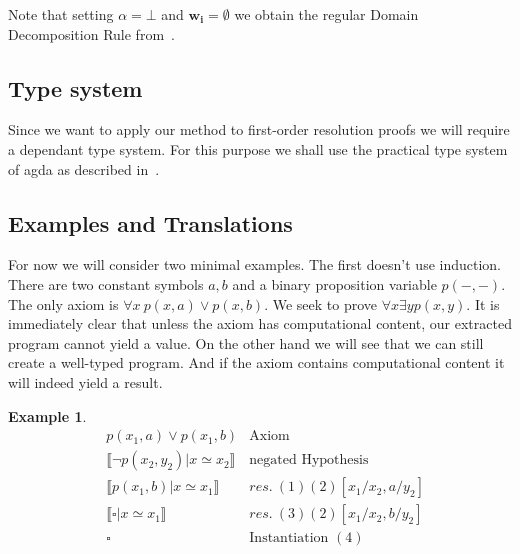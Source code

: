 \documentclass[onehalfspacing]{article}
\newtheorem{example}[theorem]{Example}
\newcommand{\llb}{\llbracket}
\newcommand{\rrb}{\rrbracket}
\begin{document}
Note that setting $\alpha=\bot$ and $\mathbf{w_i}=\emptyset$ we obtain the regular Domain Decomposition Rule from~\cite{Echenim_2019}.

\subsection{Type system}

Since we want to apply our method to first-order resolution proofs we will require a dependant type system. For this purpose we shall use the practical type system of agda as described in~\cite{agda}.

\subsection{Examples and Translations}

For now we will consider two minimal examples. The first doesn't use induction. There are two constant symbols $a, b$ and a binary proposition variable $p(-, -)$. The only axiom is $\forall x\:p(x,a)\vee p(x, b)$. We seek to prove $\forall x\exists y p(x, y)$. It is immediately clear that unless the axiom has computational content, our extracted program cannot yield a value. On the other hand we will see that we can still create a well-typed program. And if the axiom contains computational content it will indeed yield a result.




\begin{example}\hfill
	\begin{align}
		& p(x_1,a)\vee p(x_1, b) & \text{Axiom}\\
		& \llb \neg p(x_2, y_2) | x\simeq x_2\rrb & \text{negated Hypothesis}\\
		& \llb p(x_1, b) | x\simeq x_1\rrb & res.\:(1) (2) [x_1/x_2, a/y_2]\\
		& \llb \square | x\simeq x_1\rrb & res.\:(3) (2) [x_1/x_2, b/y_2]\\
		& \square &\text{Instantiation }(4)
	\end{align}
\end{example}
\end{document}
